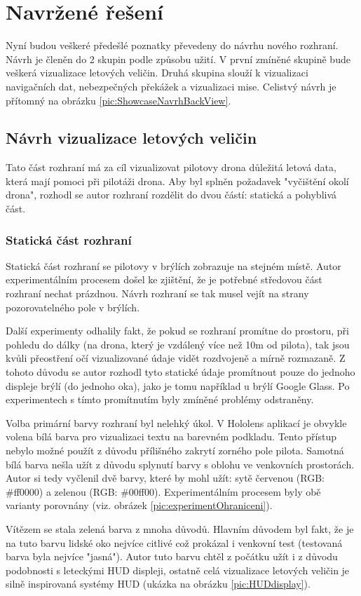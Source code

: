 \section{Navržené řešení}
Nyní budou veškeré předešlé poznatky převedeny do návrhu nového rozhraní. Návrh je členěn do 2 skupin podle způsobu užití. V první zmíněné skupině bude veškerá vizualizace letových veličin. Druhá skupina slouží k vizualizaci navigačních dat, nebezpečných překážek a vizualizaci mise. Celistvý návrh je přítomný na obrázku \ref{pic:ShowcaseNavrhBackView}.
\subsection{Návrh vizualizace letových veličin}
Tato část rozhraní má za cíl vizualizovat pilotovy drona důležitá letová data, která mají pomoci při pilotáži drona. Aby byl splněn požadavek "vyčištění okolí drona", rozhodl se autor rozhraní rozdělit do dvou částí: statická a pohyblivá část. 
\subsubsection{Statická část rozhraní}
Statická část rozhraní se pilotovy v brýlích zobrazuje na stejném místě. Autor experimentálním procesem došel ke zjištění, že je potřebné středovou část rozhraní nechat prázdnou. Návrh rozhraní se tak musel vejít na strany pozorovatelného pole v brýlích. 

Další experimenty odhalily fakt, že pokud se rozhraní promítne do prostoru, při pohledu do dálky (na drona, který je vzdálený více než 10m od pilota), tak jsou kvůli přeostření očí vizualizované údaje vidět rozdvojeně  a mírně rozmazaně. Z tohoto důvodu se autor rozhodl tyto statické údaje promítnout pouze do jednoho displeje brýlí  (do jednoho oka), jako je tomu například u brýlí Google Glass. Po experimentech s tímto promítnutím byly zmíněné problémy odstraněny. 

Volba primární barvy rozhraní byl nelehký úkol. V Hololens aplikací je obvykle volena bílá barva pro vizualizaci textu na barevném podkladu. Tento přístup nebylo možné použít z důvodu přílišného zakrytí zorného pole pilota. Samotná bílá barva nešla užít z důvodu splynutí barvy s oblohu ve venkovních prostorách. Autor si tedy vyčlenil dvě barvy, které by mohl užít: sytě červenou (RGB: \#ff0000) a zelenou (RGB: \#00ff00). Experimentálním procesem byly obě varianty porovnány (viz. obrázek \ref{pic:experimentOhraniceni}). 

Vítězem se stala zelená barva z mnoha důvodů. Hlavním důvodem byl fakt, že je na tuto barvu lidské oko nejvíce citlivé což prokázal i venkovní test (testovaná barva byla nejvíce "jasná"). Autor tuto barvu chtěl z počátku užít i z důvodu podobnosti s leteckými HUD displeji, ostatně  celá vizualizace letových veličin je silně inspirovaná systémy HUD (ukázka na obrázku \ref{pic:HUDdisplay}).   


